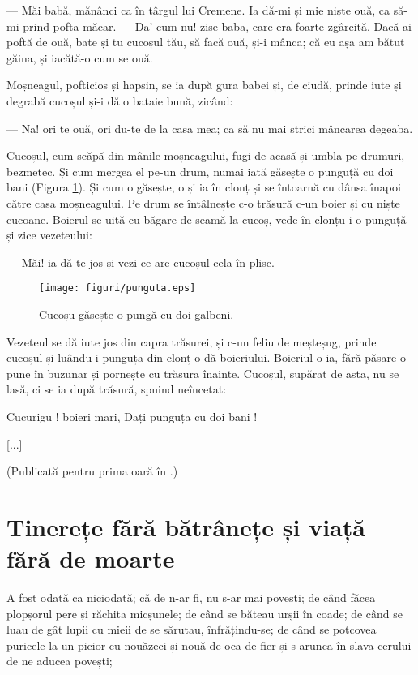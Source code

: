 \documentclass[12pt, a4paper, oneside, romanian]{teza-upb}
\begin{document}
— Măi babă, mănânci ca în târgul lui Cremene. Ia dă-mi și mie niște
ouă, ca să-mi prind pofta măcar. — Da' cum nu! zise baba, care era
foarte zgârcită. Dacă ai poftă de ouă, bate și tu cucoșul tău, să facă
ouă, și-i mânca; că eu așa am bătut găina, și iacătă-o cum se ouă.

Moșneagul, pofticios și hapsin, se ia după gura babei și, de ciudă,
prinde iute și degrabă cucoșul și-i dă o bataie bună, zicând:

— Na! ori te ouă, ori du-te de la casa mea; ca să nu mai strici
mâncarea degeaba.

Cucoșul, cum scăpă din mânile moșneagului, fugi de-acasă și umbla pe
drumuri, bezmetec. Și cum mergea el pe-un drum, numai iată găsește o
punguță cu doi bani (Figura \ref{fig:punguta}). Și cum o găsește, o și ia în clonț și se întoarnă
cu dânsa înapoi către casa moșneagului. Pe drum se întâlnește c-o
trăsură c-un boier și cu niște cucoane. Boierul se uită cu băgare de
seamă la cucoș, vede în clonțu-i o punguță și zice vezeteului:

— Măi! ia dă-te jos și vezi ce are cucoșul cela în plisc.

\begin{figure}[tb]
\centering
\texttt{[image: figuri/punguta.eps]}
\caption{Cucoșu găsește o pungă cu doi galbeni.}
\label{fig:punguta}
\end{figure}



Vezeteul se dă iute jos din capra trăsurei, și c-un feliu de meșteșug,
prinde cucoșul și luându-i punguța din clonț o dă boieriului. Boieriul
o ia, fără păsare o pune în buzunar și pornește cu trăsura
înainte. Cucoșul, supărat de asta, nu se lasă, ci se ia după trăsură,
spuind neîncetat:

Cucurigu ! boieri mari, Dați punguța cu doi bani !


[...]

(Publicată pentru prima oară în \cite{punguta1876}.)

\section{Tinerețe fără bătrânețe și viață fără de moarte}

A fost odată ca niciodată; că de n-ar fi, nu s-ar mai povesti; de când
făcea plopșorul pere și răchita micșunele; de când se băteau urșii în
coade; de când se luau de gât lupii cu mieii de se sărutau,
înfrățindu-se; de când se potcovea puricele la un picior cu nouăzeci
și nouă de oca de fier și s-arunca în slava cerului de ne aducea
povești;
\end{document}
